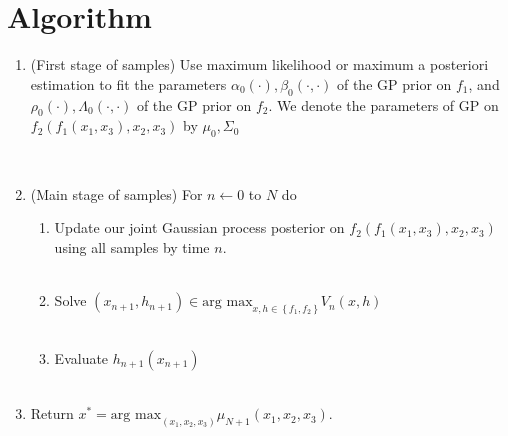 \documentclass[12pt,english]{article}
\begin{document}
\section{Algorithm}
\begin{enumerate}
\item (First stage of samples) Use maximum likelihood or maximum a posteriori estimation to fit the
parameters $\alpha_{0}\left(\cdot\right),\beta_{0}\left(\cdot,\cdot\right)$
of the GP prior on $f_{1}$, and $\rho_{0}\left(\cdot\right),\Lambda_{0}\left(\cdot,\cdot\right)$
of the GP prior on $f_{2}$. We denote the parameters of GP on $f_{2}\left(f_{1}\left(x_{1},x_{3}\right),x_{2},x_{3}\right)$ by
$\mu_{0},\Sigma_{0}$

\textrm{}\\
\item (Main stage of samples) For $n\leftarrow0$ to $N$ do
\begin{enumerate}
    \item Update our joint Gaussian process posterior on $f_{2}\left(f_{1}\left(x_{1},x_{3}\right),x_{2},x_{3}\right)$ using all samples by time $n$.\\
    \textrm{}\\
\item Solve $\left(x_{n+1},h_{n+1}\right)\in\mbox{arg max}_{x,h\in\left\{ f_{1},f_{2}\right\} }V_{n}\left(x,h\right)$\\
\textrm{}\\
\item Evaluate $h_{n+1}\left(x_{n+1}\right)$\\
\textrm{}\\
\end{enumerate}
\item Return $x^{*}=\mbox{arg max}_{\left(x_{1},x_{2},x_{3}\right)}\mu_{N+1}\left(x_{1},x_{2},x_{3}\right)$.


 \end{enumerate}
\end{document}
